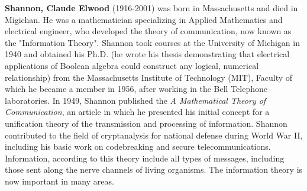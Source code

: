 \textbf{Shannon, Claude Elwood} (1916-2001) was born in Massachusetts and died in Migichan. He was a mathematician specializing in Applied Mathematics and electrical engineer, who developed the theory of communication, now known as the "Information Theory". Shannon took courses at the University of Michigan in 1940 and obtained his Ph.D. (he wrote his thesis demonstrating that electrical applications of Boolean algebra could construct any logical, numerical relationship) from the Massachusetts Institute of Technology (MIT), Faculty of which he became a member in 1956, after working in the Bell Telephone laboratories. In 1949, Shannon published the \textit{A Mathematical Theory of Communication}, an article in which he presented his initial concept for a unification theory of the transmission and processing of information. Shannon contributed to the field of cryptanalysis for national defense during World War II, including his basic work on codebreaking and secure telecommunications. Information, according to this theory include all types of messages, including those sent along the nerve channels of living organisms. The information theory is now important in many areas.

